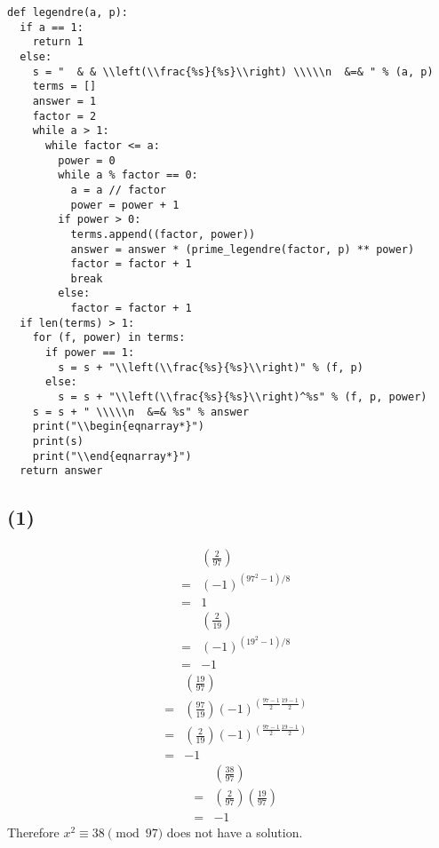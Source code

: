 \documentclass{article}
\begin{document}
\begin{verbatim}
def legendre(a, p):
  if a == 1:
    return 1
  else:
    s = "  & & \\left(\\frac{%s}{%s}\\right) \\\\\n  &=& " % (a, p)
    terms = []
    answer = 1
    factor = 2
    while a > 1:
      while factor <= a:
        power = 0
        while a % factor == 0:
          a = a // factor
          power = power + 1        
        if power > 0:
          terms.append((factor, power))
          answer = answer * (prime_legendre(factor, p) ** power)
          factor = factor + 1
          break
        else:
          factor = factor + 1
  if len(terms) > 1:
    for (f, power) in terms:
      if power == 1:
        s = s + "\\left(\\frac{%s}{%s}\\right)" % (f, p)
      else:
        s = s + "\\left(\\frac{%s}{%s}\\right)^%s" % (f, p, power)
    s = s + " \\\\\n  &=& %s" % answer
    print("\\begin{eqnarray*}")
    print(s)
    print("\\end{eqnarray*}")
  return answer    
\end{verbatim}
\subsection*{(1)}
\begin{eqnarray*}
  & & \left(\frac{2}{97}\right) \\
  &=& (-1)^{(97^2 - 1)/8} \\
  &=& 1
\end{eqnarray*}
\begin{eqnarray*}
  & & \left(\frac{2}{19}\right) \\
  &=& (-1)^{(19^2 - 1)/8} \\
  &=& -1
\end{eqnarray*}
\begin{eqnarray*}
  & &  \left(\frac{19}{97}\right) \\
  &=& \left(\frac{97}{19}\right) (-1)^{(\frac{97-1}{2}\frac{19-1}{2})} \\
  &=& \left(\frac{2}{19}\right) (-1)^{(\frac{97-1}{2}\frac{19-1}{2})} \\
  &=& -1
\end{eqnarray*}
\begin{eqnarray*}
  & & \left(\frac{38}{97}\right) \\
  &=& \left(\frac{2}{97}\right)\left(\frac{19}{97}\right) \\
  &=& -1
\end{eqnarray*}
Therefore $ x^2 \equiv 38 \pmod{97} $ does not have a solution.
\end{document}
